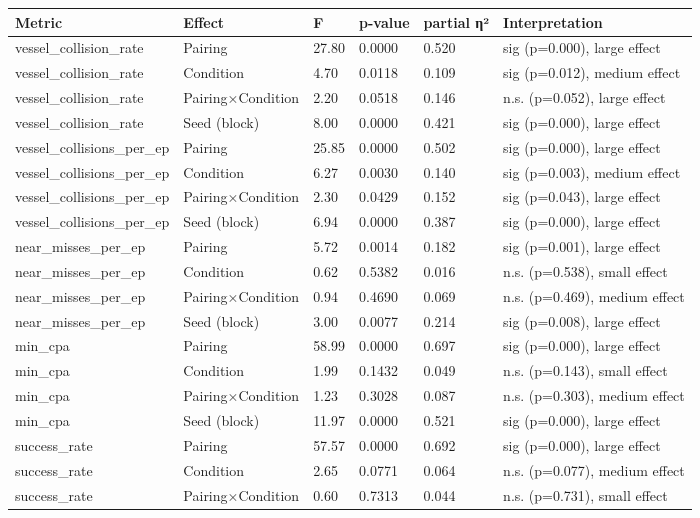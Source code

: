 \begin{tabular}{llllll}
\toprule
Metric & Effect & F & p-value & partial η² & Interpretation \\
\midrule
vessel\_collision\_rate & Pairing & 27.80 & 0.0000 & 0.520 & sig (p=0.000), large effect \\
vessel\_collision\_rate & Condition & 4.70 & 0.0118 & 0.109 & sig (p=0.012), medium effect \\
vessel\_collision\_rate & Pairing×Condition & 2.20 & 0.0518 & 0.146 & n.s. (p=0.052), large effect \\
vessel\_collision\_rate & Seed (block) & 8.00 & 0.0000 & 0.421 & sig (p=0.000), large effect \\
vessel\_collisions\_per\_ep & Pairing & 25.85 & 0.0000 & 0.502 & sig (p=0.000), large effect \\
vessel\_collisions\_per\_ep & Condition & 6.27 & 0.0030 & 0.140 & sig (p=0.003), medium effect \\
vessel\_collisions\_per\_ep & Pairing×Condition & 2.30 & 0.0429 & 0.152 & sig (p=0.043), large effect \\
vessel\_collisions\_per\_ep & Seed (block) & 6.94 & 0.0000 & 0.387 & sig (p=0.000), large effect \\
near\_misses\_per\_ep & Pairing & 5.72 & 0.0014 & 0.182 & sig (p=0.001), large effect \\
near\_misses\_per\_ep & Condition & 0.62 & 0.5382 & 0.016 & n.s. (p=0.538), small effect \\
near\_misses\_per\_ep & Pairing×Condition & 0.94 & 0.4690 & 0.069 & n.s. (p=0.469), medium effect \\
near\_misses\_per\_ep & Seed (block) & 3.00 & 0.0077 & 0.214 & sig (p=0.008), large effect \\
min\_cpa & Pairing & 58.99 & 0.0000 & 0.697 & sig (p=0.000), large effect \\
min\_cpa & Condition & 1.99 & 0.1432 & 0.049 & n.s. (p=0.143), small effect \\
min\_cpa & Pairing×Condition & 1.23 & 0.3028 & 0.087 & n.s. (p=0.303), medium effect \\
min\_cpa & Seed (block) & 11.97 & 0.0000 & 0.521 & sig (p=0.000), large effect \\
success\_rate & Pairing & 57.57 & 0.0000 & 0.692 & sig (p=0.000), large effect \\
success\_rate & Condition & 2.65 & 0.0771 & 0.064 & n.s. (p=0.077), medium effect \\
success\_rate & Pairing×Condition & 0.60 & 0.7313 & 0.044 & n.s. (p=0.731), small effect \\

\end{tabular}
